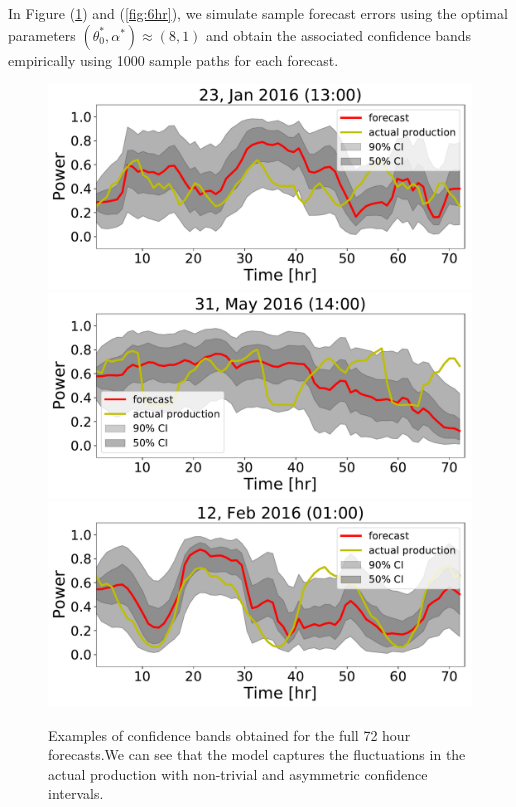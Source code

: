 \documentclass[ima, 20pt, portrait, plainboxedsections]{sciposter}
\begin{document}
\begin{multicols}{3}
 
 
In Figure (\ref{fig:72hr}) and (\ref{fig:6hr}), we simulate sample forecast errors using the optimal parameters  $(\theta_0^*, \alpha^*)\approx (8,1)$ and obtain the associated confidence bands empirically using 1000 sample paths for each forecast. %

\begin{figure}[t]
\begin{center}
   \includegraphics[width=0.8\linewidth]{72hr_forecast_CI_31.pdf} %
   \includegraphics[width=0.8\linewidth]{72hr_forecast_CI_437.pdf}
   \includegraphics[width=0.8\linewidth]{72hr_forecast_CI_82.pdf}

\end{center}
   \caption{ Examples of confidence bands obtained for the full 72 hour forecasts.We can see that the model captures the fluctuations in the actual production with non-trivial and asymmetric confidence intervals.}
\label{fig:72hr}
\end{figure}


\end{multicols}
\end{document}
